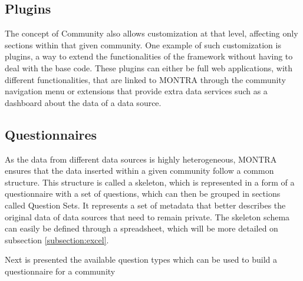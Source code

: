 \subsection*{Plugins}
The concept of Community also allows customization at that level, affecting only sections within that given community.
One example of such customization is plugins, a way to extend the functionalities of the framework without having to deal with the base code.
These plugins can either be full web applications, with different functionalities, that are linked to MONTRA through the community navigation menu or extensions that provide extra data services such as a dashboard about the data of a data source.

\subsection{Questionnaires}


As the data from different data sources is highly heterogeneous, MONTRA ensures that the data inserted within a given community follow a common structure.
This structure is called a skeleton, which is represented in a form of a questionnaire with a set of questions, which can then be grouped in sections called Question Sets.
It represents a set of metadata that better describes the original data of data sources that need to remain private.
The skeleton schema can easily be defined through a spreadsheet, which will be more detailed on subsection \ref{subsection:excel}.

Next is presented the available question types which can be used to build a questionnaire for a community

